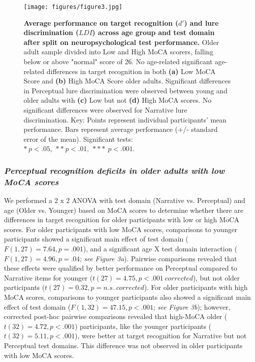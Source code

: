 \documentclass[11pt]{article}
\begin{document}
\begin{figure}
\centering
\texttt{[image: figures/figure3.jpg]}
\caption{\small \textbf{Average performance on target recognition ($d'$) and lure discrimination ($LDI$) across age group and test domain after split on neuropsychological test performance.} Older adult sample divided into Low and High MoCA scorers, falling below or above "normal" score of 26. No age-related significant age-related differences in target recognition in both \textbf{(a)} Low MoCA Score and \textbf{(b)} High MoCA Score older adults. Significant differences in Perceptual lure discrimination were observed between young and older adults with \textbf{(c)} Low but not \textbf{(d)} High MoCA scores. No significant differences were observed for Narrative lure discrimination. Key: Points represent individual participants' mean performance. Bars represent average performance (+/- standard error of the mean). Significant tests: $* \ p < .05, \ ** \ p < .01, \ *** \ p < .001$.}
\label{fig:schematic}
\end{figure}

\subsubsection*{\textit{Perceptual recognition deficits in older adults with low MoCA scores}}
We performed a 2 x 2 ANOVA with test domain (Narrative vs. Perceptual) and age (Older vs. Younger) based on MoCA scores to determine whether there are differences in target recognition for older participants with low or high MoCA scores. For older participants with low MoCA scores, comparisons to younger participants showed a significant main effect of test domain ($F(1, 27) = 7.64, p = .001$), and a significant age X test domain interaction ($F(1, 27) = 4.96, p = .04$; \textit{see Figure 3a}). Pairwise comparisons revealed that these effects were qualified by better performance on Perceptual compared to Narrative items for younger ($t(27) = 4.75, p < .001 \ corrected$), but not older participants ($t(27) = 0.32, p = n.s. \ corrected$). For older participants with high MoCA scores, comparisons to younger participants also showed a significant main effect of test domain ($F(1, 32) = 47.15, p < .001$; \textit{see Figure 3b}); however, corrected post-hoc pairwise comparisons revealed that high-MoCA older ($t(32) = 4.72, p < .001$) participants, like the younger participants ($t(32) = 5.11, p < .001$), were better at target recognition for Narrative but not Perceptual test domains. This difference was not observed in older participants with low MoCA scores. 
\end{document}
